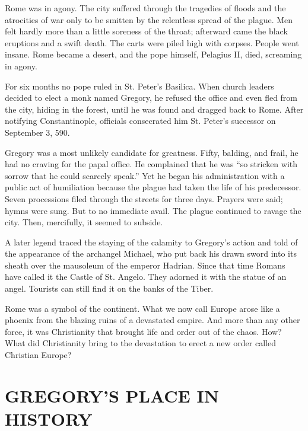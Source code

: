 
 Rome was in agony. The city suffered through the tragedies of floods and
the atrocities of war only to be smitten by the relentless spread of the plague. Men felt hardly
more than a little soreness of the throat; afterward came the black eruptions and a swift death. The
carts were piled high with corpses. People went insane. Rome became a desert, and the pope himself,
Pelagius II, died, screaming in agony.

For six months no pope ruled in St. Peter’s Basilica. When church leaders decided to elect a monk
named Gregory, he refused the office and even fled from the city, hiding in the forest, until he was
found and dragged back to Rome. After notifying Constantinople, officials consecrated him St.
Peter’s successor on September 3, 590.

Gregory was a most unlikely candidate for greatness. Fifty, balding, and frail, he had no craving
for the papal office. He complained that he was “so stricken with sorrow that he could scarcely
speak.” Yet he began his administration with a public act of humiliation because the plague had
taken the life of his predecessor. Seven processions filed through the streets for three days.
Prayers were said; hymns were sung. But to no immediate avail. The plague continued to ravage the
city. Then, mercifully, it seemed to subside.

A later legend traced the staying of the calamity to Gregory’s action and told of the appearance of
the archangel Michael, who put back his drawn sword into its sheath over the mausoleum of the
emperor Hadrian. Since that time Romans have called it the Castle of St. Angelo. They adorned it
with the statue of an angel. Tourists can still find it on the banks of the Tiber.

Rome was a symbol of the continent. What we now call Europe arose like a phoenix from the blazing
ruins of a devastated empire. And more than any other force, it was Christianity that brought life
and order out of the chaos. How? What did Christianity bring to the devastation to erect a new order
called Christian Europe?

\section{GREGORY’S PLACE IN HISTORY}

